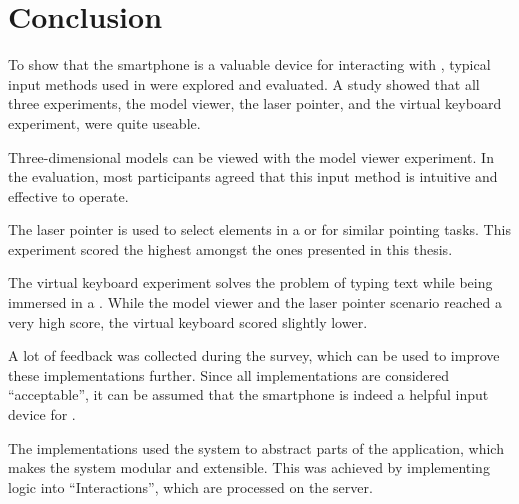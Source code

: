 \chapter{Conclusion}\label{chapter:conclusion}

To show that the smartphone is a valuable device for interacting with , typical input methods used in  were explored and evaluated. A  study showed that all three experiments, the model viewer, the laser pointer, and the virtual keyboard experiment, were quite useable.

Three-dimensional models can be viewed with the model viewer experiment. In the evaluation, most participants agreed that this input method is intuitive and effective to operate.

The laser pointer is used to select elements in a  or for similar pointing tasks. This experiment scored the highest amongst the ones presented in this thesis. 

The virtual keyboard experiment solves the problem of typing text while being immersed in a . While the model viewer and the laser pointer scenario reached a very high score, the virtual keyboard scored slightly lower. 

A lot of feedback was collected during the survey, which can be used to improve these implementations further. Since all implementations are considered \enquote{acceptable}, it can be assumed that the smartphone is indeed a helpful input device for .

The implementations used the  system to abstract parts of the application, which makes the system modular and extensible. This was achieved by implementing logic into \enquote{Interactions}, which are processed on the server. 